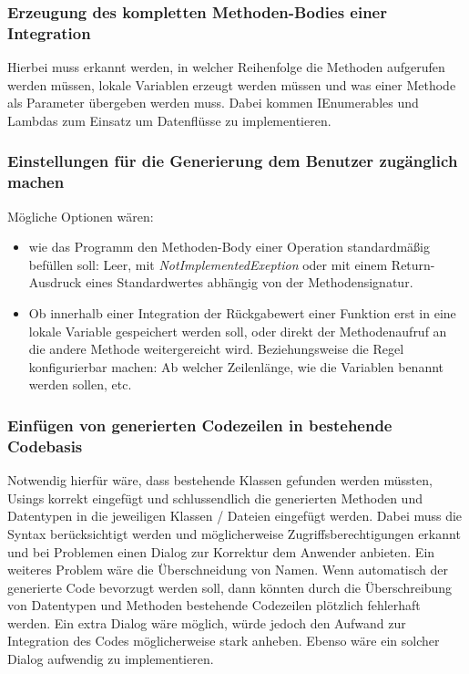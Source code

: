\subsubsection{Erzeugung des kompletten Methoden-Bodies einer Integration}

Hierbei muss erkannt werden, in welcher Reihenfolge die Methoden aufgerufen
werden müssen, lokale Variablen erzeugt werden müssen und was einer Methode als Parameter
übergeben werden muss. Dabei kommen IEnumerables und Lambdas zum Einsatz um
Datenflüsse zu implementieren.

\subsubsection{Einstellungen für die Generierung dem Benutzer zugänglich machen
}
Mögliche Optionen wären:
\begin{itemize}
\item wie das Programm den Methoden-Body einer Operation
standardmäßig befüllen soll: Leer, mit \textit{NotImplementedExeption} oder mit einem
Return-Ausdruck eines Standardwertes abhängig von der Methodensignatur.
\end{itemize}
\begin{itemize}
\item Ob innerhalb einer Integration der Rückgabewert einer Funktion erst in eine
lokale Variable gespeichert werden soll, oder direkt der Methodenaufruf an die
andere Methode weitergereicht wird. Beziehungsweise die Regel konfigurierbar
machen: Ab welcher Zeilenlänge, wie die Variablen benannt werden sollen, etc.
\end{itemize}

\subsubsection{Einfügen von generierten Codezeilen in bestehende Codebasis}

Notwendig hierfür wäre, dass bestehende Klassen gefunden werden müssten, Usings korrekt
eingefügt und schlussendlich die generierten Methoden und Datentypen in die
jeweiligen Klassen / Dateien eingefügt werden. Dabei muss die Syntax
berücksichtigt werden und möglicherweise Zugriffsberechtigungen erkannt und bei
Problemen einen Dialog zur Korrektur dem Anwender anbieten. Ein weiteres Problem
wäre die Überschneidung von Namen. Wenn automatisch der generierte Code bevorzugt
  werden soll, dann könnten durch die Überschreibung von Datentypen und Methoden
  bestehende Codezeilen plötzlich fehlerhaft werden. Ein extra Dialog wäre
  möglich, würde jedoch den Aufwand zur Integration des Codes möglicherweise stark
  anheben. Ebenso wäre ein solcher Dialog aufwendig zu implementieren.
 
